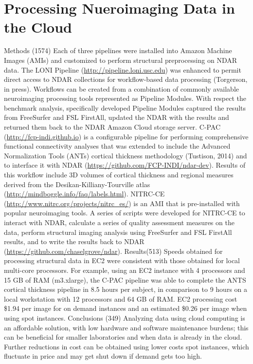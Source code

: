 \documentclass[1p,11pt]{elsarticle}
\begin{document}
\section{Processing Nueroimaging Data in the Cloud}
Methods (1574) Each of three pipelines were installed into Amazon
Machine Images (AMIs) and customized to perform structural preprocessing
on NDAR data. The LONI Pipeline (\url{http://pipeline.loni.usc.edu}) was
enhanced to permit direct access to NDAR collections for workflow-based
data processing (Torgerson, in press). Workflows can be created from a
combination of commonly available neuroimaging processing tools
represented as Pipeline Modules. With respect the benchmark analysis,
specifically developed Pipeline Modules captured the results from
FreeSurfer and FSL FirstAll, updated the NDAR with the results and
returned them back to the NDAR Amazon Cloud storage server. C-PAC
(\url{http://fcp-indi.github.io}) is a configurable pipeline for performing
comprehensive functional connectivity analyses that was extended to
include the Advanced Normalization Tools (ANTs) cortical thickness
methodology (Tustison, 2014) and to interface it with NDAR
(\url{https://github.com/FCP-INDI/ndar-dev}). Results of this workflow include
3D volumes of cortical thickness and regional measures derived from the
Desikan-Killiany-Tourville atlas
(\url{http://mindboggle.info/faq/labels.html}). NITRC-CE
(\url{http://www.nitrc.org/projects/nitrc_es/}) is an AMI that is
pre-installed with popular neuroimaging tools. A series of scripts were
developed for NITRC-CE to interact with NDAR, calculate a series of
quality assessment measures on the data, perform structural imaging
analysis using FreeSurfer and FSL FirstAll results, and to write the
results back to NDAR (\url{https://github.com/chaselgrove/ndar}).
Results(513) Speeds obtained for processing structural data in EC2 were
consistent with those obtained for local multi-core processors. For
example, using an EC2 instance with 4 processors and 15 GB of RAM
(m3.xlarge), the C-PAC pipeline was able to complete the ANTS cortical
thickness pipeline in 8.5 hours per subject, in comparison to 9 hours on
a local workstation with 12 processors and 64 GB of RAM. EC2 processing
cost \$1.94 per image for on demand instances and an estimated \$0.26 per
image when using spot instances.  Conclusions (349) Analyzing data using
cloud computing is an affordable solution, with low hardware and
software maintenance burdens; this can be beneficial for smaller
laboratories and when data is already in the cloud. Further reductions
in cost can be obtained using lower costs spot instances, which
fluctuate in price and may get shut down if demand gets too high.
\end{document}
